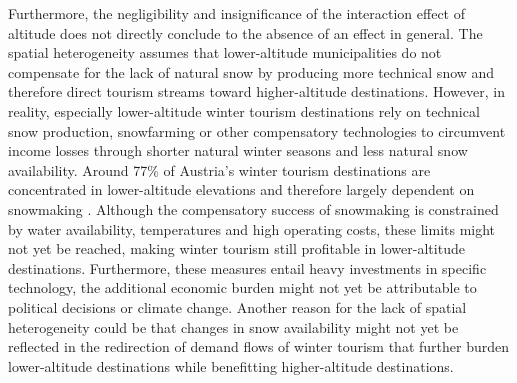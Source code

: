\documentclass{article}
\begin{document}
Furthermore, the negligibility and insignificance of the interaction effect of altitude does not directly conclude to the absence of an effect in general. The spatial heterogeneity assumes that lower-altitude municipalities do not compensate for the lack of natural snow by producing more technical snow and therefore direct tourism streams toward higher-altitude destinations. However, in reality, especially lower-altitude winter tourism destinations rely on technical snow production, snowfarming or other compensatory technologies to circumvent income losses through shorter natural winter seasons and less natural snow availability. Around 77\% of Austria's winter tourism destinations are concentrated in lower-altitude elevations and therefore largely dependent on snowmaking \parencite{Steiger2013}. Although the compensatory success of snowmaking is constrained by water availability, temperatures and high operating costs, these limits might not yet be reached, making winter tourism still profitable in lower-altitude destinations. Furthermore, these measures entail heavy investments in specific technology, the additional economic burden might not yet be attributable to political decisions or climate change. Another reason for the lack of spatial heterogeneity could be that changes in snow availability might not yet be reflected in the redirection of demand flows of winter tourism that further burden lower-altitude destinations while benefitting higher-altitude destinations. 
\end{document}
